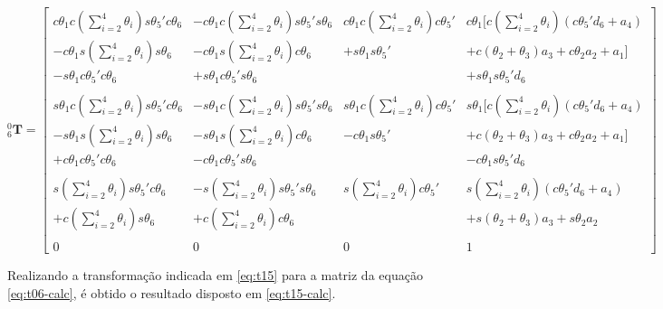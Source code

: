 \begin{equation}
    \label{eq:t06-calc}
    ^0_6\textbf{T} = \begin{bmatrix}
        c\theta_1c(\sum\limits_{i=2}^4\theta_i)s\theta_5'c\theta_6 & -c\theta_1c(\sum\limits_{i=2}^4\theta_i)s\theta_5's\theta_6 & c\theta_1c(\sum\limits_{i=2}^4\theta_i)c\theta_5' & c\theta_1[c(\sum\limits_{i=2}^4\theta_i)(c\theta_5'd_6 + a_4) \\
        -c\theta_1s(\sum\limits_{i=2}^4\theta_i)s\theta_6          & -c\theta_1s(\sum\limits_{i=2}^4\theta_i)c\theta_6           & +s\theta_1s\theta_5'                             & +c(\theta_2+\theta_3)a_3 + c\theta_2a_2 + a_1]\\
        -s\theta_1c\theta_5'c\theta_6                             & +s\theta_1c\theta_5's\theta_6                              &                                                  & +s\theta_1s\theta_5'd_6\\
        \\
        s\theta_1c(\sum\limits_{i=2}^4\theta_i)s\theta_5'c\theta_6 & -s\theta_1c(\sum\limits_{i=2}^4\theta_i)s\theta_5's\theta_6 & s\theta_1c(\sum\limits_{i=2}^4\theta_i)c\theta_5' & s\theta_1[c(\sum\limits_{i=2}^4\theta_i)(c\theta_5'd_6 + a_4) \\
        -s\theta_1s(\sum\limits_{i=2}^4\theta_i)s\theta_6          & -s\theta_1s(\sum\limits_{i=2}^4\theta_i)c\theta_6           & -c\theta_1s\theta_5'                             & +c(\theta_2+\theta_3)a_3 + c\theta_2a_2 + a_1]\\
        +c\theta_1c\theta_5'c\theta_6                             & -c\theta_1c\theta_5's\theta_6                              &                                                  & -c\theta_1s\theta_5'd_6\\
        \\
        s(\sum\limits_{i=2}^4\theta_i)s\theta_5'c\theta_6 & -s(\sum\limits_{i=2}^4\theta_i)s\theta_5's\theta_6 & s(\sum\limits_{i=2}^4\theta_i)c\theta_5' & s(\sum\limits_{i=2}^4\theta_i)(c\theta_5'd_6 + a_4) \\
        +c(\sum\limits_{i=2}^4\theta_i)s\theta_6          & +c(\sum\limits_{i=2}^4\theta_i)c\theta_6           &                                         & +s(\theta_2+\theta_3)a_3 + s\theta_2a_2 \\
        \\
        0 & 0 & 0 & 1
    \end{bmatrix}
\end{equation}

Realizando a transformação indicada em \ref{eq:t15} para a matriz da equação \ref{eq:t06-calc}, é obtido o resultado
disposto em \ref{eq:t15-calc}.

